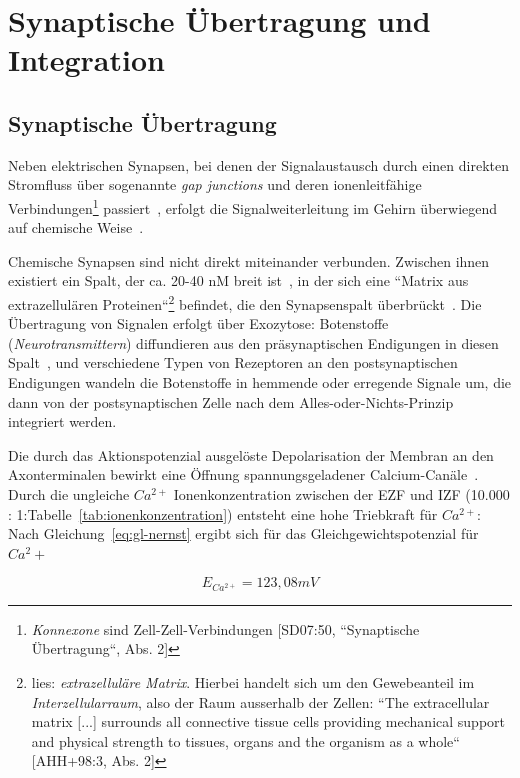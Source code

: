 {{\vskip 1.6in


\pagebreak

\section{Synaptische Übertragung und Integration}


\subsection{Synaptische Übertragung}\label{synaptischeuebertragung}
Neben elektrischen Synapsen, bei denen der Signalaustausch durch einen direkten Stromfluss über sogenannte \textit{gap junctions} und deren ionenleitfähige Verbindungen\footnote{
 \textit{Konnexone} sind Zell-Zell-Verbindungen {[SD07:50, ``Synaptische Übertragung``, Abs. 2]}
} passiert~\cite[119]{BCP18}, erfolgt die Signalweiterleitung im Gehirn überwiegend auf chemische Weise~\cite[121 ff.]{BCP18}.

Chemische Synapsen sind nicht direkt miteinander verbunden. 
Zwischen ihnen existiert ein Spalt, der ca. 20-40 nM breit ist~\cite[184]{KSJ+13}, in der sich eine ``Matrix aus extrazellulären Proteinen``\footnote{
 lies: \textit{extrazelluläre Matrix}. Hierbei handelt sich um den Gewebeanteil im \textit{Interzellularraum}, also der Raum ausserhalb der Zellen: ``The extracellular matrix {[...]} surrounds all connective tissue cells providing mechanical support and physical strength to tissues, organs and the organism as a whole`` {[AHH+98:3, Abs. 2]}
} befindet, die den Synapsenspalt überbrückt~\cite[122]{BCP18}.
Die Übertragung von Signalen erfolgt über Exozytose: Botenstoffe (\textit{Neurotransmittern}) diffundieren aus den präsynaptischen Endigungen in diesen Spalt~\cite[122]{BCP18}, und verschiedene Typen von Rezeptoren an den postsynaptischen Endigungen wandeln die Botenstoffe in hemmende oder erregende Signale um, die dann von der postsynaptischen Zelle nach dem Alles-oder-Nichts-Prinzip integriert werden.

Die durch das Aktionspotenzial ausgelöste Depolarisation der Membran an den Axonterminalen bewirkt eine Öffnung spannungsgeladener Calcium-Canäle~\cite[184]{KSJ+13}.
Durch die ungleiche $Ca^{2+}$ Ionenkonzentration zwischen der EZF und IZF (10.000 : 1:Tabelle~\ref{tab:ionenkonzentration}) entsteht eine hohe Triebkraft für $Ca^{2+}$: Nach Gleichung~\ref{eq:gl-nernst} ergibt sich für das Gleichgewichtspotenzial für $Ca^2+$

\begin{equation}
 E_{Ca^{2+}} = 123,08 mV
 \label{eq:gl-eqca2}
\end{equation}



}}
